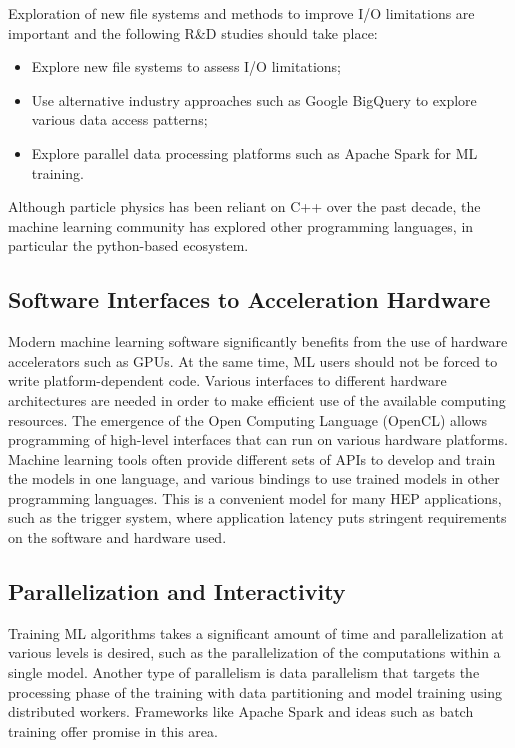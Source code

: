 Exploration of new file systems and methods to improve I/O limitations are important and the following R\&D studies should take place:
\begin{itemize}
 \item Explore new file systems to assess I/O limitations;
 \item Use alternative industry approaches such as Google BigQuery to explore various data access patterns;
 \item Explore parallel data processing platforms such as Apache Spark for ML training.
\end{itemize}

Although particle physics has been reliant on C++ over the past decade, the machine learning community has explored other programming languages, in particular the python-based ecosystem.

\subsection{Software Interfaces to Acceleration Hardware}\label{sec:software_proglang}
Modern machine learning software significantly benefits from the use of hardware accelerators such as GPUs. At the same time, ML users should not be forced to write platform-dependent code. Various interfaces to different hardware architectures are needed in order to make efficient use of the available computing resources. The emergence of the Open Computing Language (OpenCL) allows programming of high-level interfaces that can run on various hardware platforms.\\

Machine learning tools often provide different sets of APIs to develop and train the models in one language, and various bindings to use trained models in other programming languages. This is a convenient model for many HEP applications, such as the trigger system, where application latency puts stringent requirements on the software and hardware used.

\subsection{Parallelization and Interactivity}
Training ML algorithms takes a significant amount of time and parallelization at various levels is desired, such as the parallelization of the computations within a single model. Another type of parallelism is data parallelism that targets the processing phase of the training with data partitioning and model training using distributed workers. Frameworks like Apache Spark and ideas such as batch training offer promise in this area.\\

